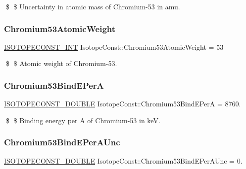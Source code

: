 \$ \$ Uncertainty in atomic mass of Chromium-\/53 in amu. \mbox{\label{group___isotope_const-_chromium-_cr53_ga42fe3beb4c80b21a366d0bea863e55e3}} 
\subsubsection{\texorpdfstring{Chromium53\+Atomic\+Weight}{Chromium53AtomicWeight}}
{\footnotesize\ttfamily \mbox{\hyperlink{group___isotope_const-_macros_ga5f18360b3e99483a35c32d789e62621c}{I\+S\+O\+T\+O\+P\+E\+C\+O\+N\+S\+T\+\_\+\+I\+NT}} Isotope\+Const\+::\+Chromium53\+Atomic\+Weight = 53}

\$ \$ Atomic weight of Chromium-\/53. \mbox{\label{group___isotope_const-_chromium-_cr53_gac24345711de08ad63e0f74be8ebb026a}} 
\subsubsection{\texorpdfstring{Chromium53\+Bind\+E\+PerA}{Chromium53BindEPerA}}
{\footnotesize\ttfamily \mbox{\hyperlink{group___isotope_const-_macros_ga8f45a7272ce02c0b4c65c44636ed719a}{I\+S\+O\+T\+O\+P\+E\+C\+O\+N\+S\+T\+\_\+\+D\+O\+U\+B\+LE}} Isotope\+Const\+::\+Chromium53\+Bind\+E\+PerA = 8760.}

\$ \$ Binding energy per A of Chromium-\/53 in keV. \mbox{\label{group___isotope_const-_chromium-_cr53_ga1e83b5d9eee628d2c7a6693fa1c1e4cd}} 
\subsubsection{\texorpdfstring{Chromium53\+Bind\+E\+Per\+A\+Unc}{Chromium53BindEPerAUnc}}
{\footnotesize\ttfamily \mbox{\hyperlink{group___isotope_const-_macros_ga8f45a7272ce02c0b4c65c44636ed719a}{I\+S\+O\+T\+O\+P\+E\+C\+O\+N\+S\+T\+\_\+\+D\+O\+U\+B\+LE}} Isotope\+Const\+::\+Chromium53\+Bind\+E\+Per\+A\+Unc = 0.}

